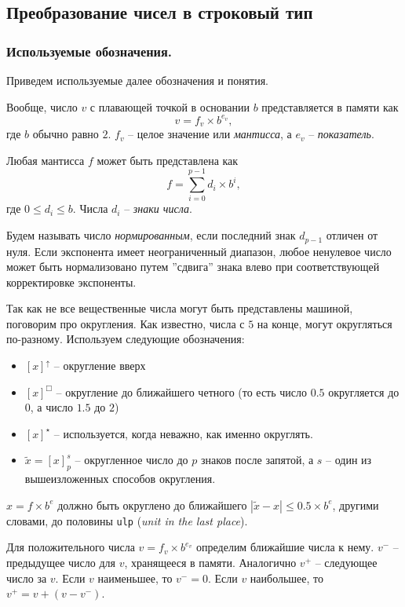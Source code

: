 \documentclass[specialist,subf,href,colorlinks=true,14pt
,times,mtpro,specialist
]{disser}
\begin{document}
\subsection{Преобразование чисел в строковый тип}
\subsubsection{Используемые обозначения.}
Приведем используемые далее обозначения и понятия.

Вообще, число $v$ с плавающей точкой в основании $b$ представляется в памяти как $$v = f_v \times b^{e_v},$$ где $b$ обычно равно $2$. $f_v$ -- целое значение или \textit{мантисса}, а $e_v$ -- \textit{показатель}.

Любая мантисса $f$ может быть представлена как $$f = \sum\limits_{i=0}^{p-1} d_i \times b^i,$$ где $0 \leqslant d_i \leqslant b$. 
Числа $d_i$ -- \textit{знаки числа}.

Будем называть число \textit{нормированным}, если последний знак $d_{p-1}$ отличен от нуля.
Если экспонента имеет неограниченный диапазон, любое ненулевое число может быть нормализовано путем ''сдвига'' знака влево при соответствующей корректировке экспоненты. 

Так как не все вещественные числа могут быть представлены машиной, поговорим про округления.
Как известно, числа с $5$ на конце, могут округляться по-разному.
Используем следующие обозначения:
\begin{itemize}
\item $[x]^\uparrow$ -- округление вверх
\item $[x]^\Box$ -- округление до ближайшего четного (то есть число $0.5$ округляется до $0$, а число $1.5$ до $2$)
\item $[x]^\star$ -- используется, когда неважно, как именно округлять.
\item $\tilde x = \left[ x \right]_p^s$ -- округленное число до $p$ знаков после запятой, а $s$ -- один из вышеизложенных способов округления.
\end{itemize}

$x=f \times b^e$ должно быть округлено до ближайшего $|\tilde x - x| \leqslant 0.5 \times b^e$, другими словами, до половины \texttt{ulp} (\textit{unit in the last place}).

Для положительного числа $v=f_v \times b^{e_v}$ определим ближайшие числа к нему.
$v^{-}$ -- предыдущее число для $v$, хранящееся в памяти.
Аналогично $v^{+}$ -- следующее число за $v$.
Если $v$ наименьшее, то $v^{-} = 0$.
Если $v$ наибольшее, то $v^{+} = v + (v - v^{-})$.
\end{document}
